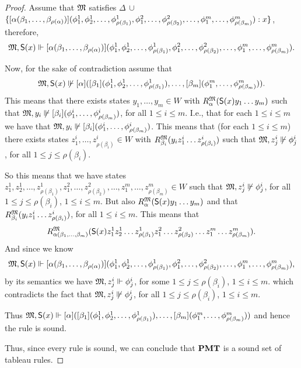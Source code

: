\begin{proof}
\par Assume that $\mathfrak{M}$ satisfies $\Delta \,\cup\, $$\{[\alpha(\beta_1, \ldots ,\beta_{\rho(\alpha)})](\phi_1^1,\phi_2^1, \ldots ,\phi_{\rho(\beta_1)}^1, \phi_1^2, \ldots ,\phi_{\rho(\beta_2)}^2, \ldots, \phi_1^m , \ldots , \\ \phi_{\rho(\beta_m)}^m):x\}$, therefore, $$\mathfrak{M}, \mathsf{S}(x) \Vdash [\alpha(\beta_1,\ldots,\beta_{\rho(\alpha)})](\phi_1^1,\phi_2^1, \ldots ,\phi_{\rho(\beta_1)}^1, \phi_1^2, \ldots ,\phi_{\rho(\beta_2)}^2, \ldots, \phi_1^m ,\ldots , \phi_{\rho(\beta_m)}^m).$$
\par Now, for the sake of contradiction assume that $$\mathfrak{M}, \mathsf{S}(x) \not\Vdash [\alpha]([\beta_1](\phi_1^1,\phi_2^1, \ldots ,\phi_{\rho(\beta_1)}^1), \ldots , [\beta_{m}](\phi_1^m , \ldots ,\phi_{\rho(\beta_m)}^m)).$$ This means that there exists states $y_1,\ldots, y_m\in W$ with $R^{\mathfrak{M}}_\alpha (\mathsf{S}(x)y_1\ldots y_m)$ such that $\mathfrak{M}, y_i \not\Vdash [\beta_i](\phi^i_1,\ldots,\phi^i_{\rho(\beta_m)})$, for all $1\leq i\leq m$. I.e., that for each $1 \leq i \leq m$ we have that $\mathfrak{M}, y_i \not\Vdash [\beta_i](\phi^i_1,\ldots,\phi^i_{\rho(\beta_m)})$. This means that (for each $1 \leq i \leq m$) there exists states $z^i_1,\ldots, z^i_{\rho(\beta_i)} \in W$ with $R^{\mathfrak{M}}_{\beta_i}(y_iz^i_1\ldots z^i_{\rho(\beta_i)})$ such that $\mathfrak{M}, z^i_j \not\Vdash \phi^i_j$, for all $1\leq j\leq\rho(\beta_i)$.
\par So this means that we have states $z_1^1,z_2^1,\ldots,z_{\rho(\beta_1)}^1,z_1^2,\ldots,z_{\rho(\beta_2)}^2,\ldots,z_1^{m},\ldots,z_{\rho(\beta_m)}^m \in W$ such that $\mathfrak{M}, z^i_j \not\Vdash \phi^i_j$, for all $1\leq j\leq \rho(\beta_i)$, $1\leq i\leq m$. But also $R^{\mathfrak{M}}_\alpha(\mathsf{S}(x)y_1\ldots y_m)$ and that $R^{\mathfrak{M}}_{\beta_i}(y_iz^i_1\ldots z^i_{\rho(\beta_i)})$, for all $1\leq i\leq m$. This means that $$R^{\mathfrak{M}}_{\alpha(\beta_1,\ldots,\beta_m)}(\mathsf{S}(x)z_1^1z_2^1\ldots z_{\rho(\beta_1)}^1z_1^2\ldots z_{\rho(\beta_2)}^2\ldots z_1^{m}\ldots z_{\rho(\beta_m)}^m).$$ And since we know $$\mathfrak{M}, \mathsf{S}(x) \Vdash [\alpha(\beta_1,\ldots,
\beta_{\rho(\alpha)})](\phi_1^1,\phi_2^1, \ldots ,\phi_{\rho(\beta_1)}^1, \phi_1^2, \ldots ,\phi_{\rho(\beta_2)}^2, \ldots , \phi_1^m ,\ldots ,\phi_{\rho(\beta_m)}^m),$$ by its semantics we have $\mathfrak{M}, z^i_j \Vdash \phi^i_j$, for some $1\leq j\leq\rho(\beta_i)$, $1\leq i\leq m$. which contradicts the fact that $\mathfrak{M}, z^i_j \not\Vdash \phi^i_j$, for all $1\leq j\leq\rho(\beta_i)$, $1\leq i\leq m$.
\par Thus $\mathfrak{M}, \mathsf{S}(x) \Vdash [\alpha]([\beta_1](\phi_1^1,\phi_2^1,\ldots ,\phi_{\rho(\beta_1)}^1), \ldots , [\beta_{m}](\phi_1^m ,\ldots ,\phi_{\rho(\beta_m)}^m))$ and hence the rule is sound.

\par Thus, since every rule is sound, we can conclude that $\textbf{PMT}$ is a sound set of tableau rules.
\end{proof}
